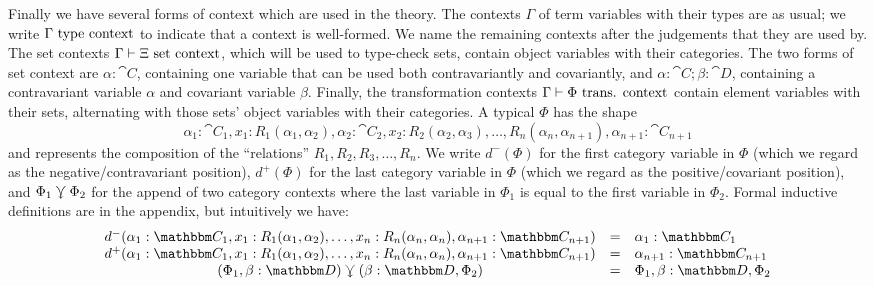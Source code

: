 \documentclass{llncs}
\begin{document}
Finally we have several forms of context which are used in the theory.
The contexts $\Gamma$ of term variables with their types are as usual;
we write ${\Gamma \,\,\textrm{type context}}$ to indicate that a context is well-formed.
We name the remaining contexts after the judgements that they are used
by.  The set contexts $\Gamma \vdash \Xi \,\,\textrm{set context}$, which will be used
to type-check sets, contain object variables with their categories. The
two forms of set context are $\alpha : \cat C$, containing one variable
that can be used both contravariantly and covariantly, and $\alpha :
\cat C ; \beta : \cat D$, containing a contravariant variable $\alpha$
and covariant variable $\beta$.  Finally, the transformation contexts
$\Gamma \vdash \Phi \,\,\textrm{trans. context}$ contain element variables with their sets, alternating with those
sets' object variables with their categories.  A typical $\Phi$ has the
shape
\[
\alpha_1 : \cat C_1, x_1:R_1(\alpha_1,\alpha_2), \alpha_2 : \cat C_2,
x_2:R_2(\alpha_2,\alpha_3), \ldots, R_n(\alpha_n,\alpha_{n+1}),
\alpha_{n+1} : \cat C_{n+1}
\]
and represents the composition of the ``relations'' $R_1, R_2, R_3, \ldots,
R_n$.  We write $d^-(\Phi)$ for the first category variable in $\Phi$
(which we regard as the negative/contravariant position), $d^+(\Phi)$
for the last category variable in $\Phi$ (which we regard as the
positive/covariant position), and $\Phi_1 \curlyveedownarrow \Phi_2$ for the append
of two category contexts where the last variable in $\Phi_1$ is equal to
the first variable in $\Phi_2$.  Formal inductive definitions are in the
appendix, but intuitively we have: 
\[
\begin{array}{ccl}
d^-(\alpha_1 : \cat C_1, x_1:R_1(\alpha_1,\alpha_2), \ldots, x_n:R_n(\alpha_n,\alpha_n), \alpha_{n+1} : \cat C_{n+1}) & = & \alpha_1 : \cat C_1\\
d^+(\alpha_1 : \cat C_1, x_1:R_1(\alpha_1,\alpha_2), \ldots, x_n:R_n(\alpha_n,\alpha_n), \alpha_{n+1} : \cat C_{n+1}) & = & \alpha_{n+1}:\cat C_{n+1}\\
(\Phi_1,\beta:\cat D) \jnctx (\beta:\cat D, \Phi_2) & = & \Phi_1, \beta : \cat D, \Phi_2
\end{array}
\]
\end{document}
